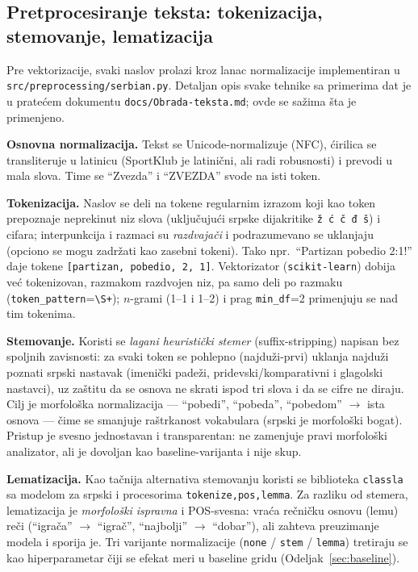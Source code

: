 \documentclass[11pt,a4paper]{article}
\begin{document}
\subsection{Pretprocesiranje teksta: tokenizacija, stemovanje, lematizacija}\label{sec:pretprocesiranje}
Pre vektorizacije, svaki naslov prolazi kroz lanac normalizacije implementiran u
\texttt{src/preprocessing/serbian.py}. Detaljan opis svake tehnike sa primerima dat je
u pratećem dokumentu \texttt{docs/Obrada-teksta.md}; ovde se sažima šta je primenjeno.

\textbf{Osnovna normalizacija.} Tekst se Unicode-normalizuje (NFC), ćirilica se
transliteruje u latinicu (SportKlub je latinični, ali radi robusnosti) i prevodi u
mala slova. Time se \enquote{Zvezda} i \enquote{ZVEZDA} svode na isti token.

\textbf{Tokenizacija.} Naslov se deli na tokene regularnim izrazom koji kao token
prepoznaje neprekinut niz slova (uključujući srpske dijakritike \texttt{ž ć č đ š}) i
cifara; interpunkcija i razmaci su \emph{razdvajači} i podrazumevano se uklanjaju
(opciono se mogu zadržati kao zasebni tokeni). Tako npr.\ \enquote{Partizan pobedio
2:1!} daje tokene \texttt{[partizan, pobedio, 2, 1]}. Vektorizator
(\texttt{scikit-learn}) dobija već tokenizovan, razmakom razdvojen niz, pa samo deli po
razmaku (\texttt{token\_pattern}=\texttt{\textbackslash S+}); $n$-grami (1--1 i 1--2) i
prag \texttt{min\_df}=2 primenjuju se nad tim tokenima.

\textbf{Stemovanje.} Koristi se \emph{lagani heuristički stemer} (suffix-stripping)
napisan bez spoljnih zavisnosti: za svaki token se pohlepno (najduži-prvi) uklanja
najduži poznati srpski nastavak (imenički padeži, pridevski/komparativni i glagolski
nastavci), uz zaštitu da se osnova ne skrati ispod tri slova i da se cifre ne diraju.
Cilj je morfološka normalizacija --- \enquote{pobedi}, \enquote{pobeda}, \enquote{pobedom}
$\to$ ista osnova --- čime se smanjuje raštrkanost vokabulara (srpski je
morfološki bogat). Pristup je svesno jednostavan i transparentan: ne zamenjuje pravi
morfološki analizator, ali je dovoljan kao baseline-varijanta i nije skup.

\textbf{Lematizacija.} Kao tačnija alternativa stemovanju koristi se biblioteka
\texttt{classla}~\cite{ljubesic2018classla} sa modelom za srpski i procesorima
\texttt{tokenize,pos,lemma}. Za razliku od stemera, lematizacija je
\emph{morfološki ispravna} i POS-svesna: vraća rečničku osnovu (lemu) reči
(\enquote{igrača} $\to$ \enquote{igrač}, \enquote{najbolji} $\to$ \enquote{dobar}),
ali zahteva preuzimanje modela i sporija je. Tri varijante normalizacije
(\texttt{none} / \texttt{stem} / \texttt{lemma}) tretiraju se kao hiperparametar čiji
se efekat meri u baseline gridu (Odeljak~\ref{sec:baseline}).
\end{document}
